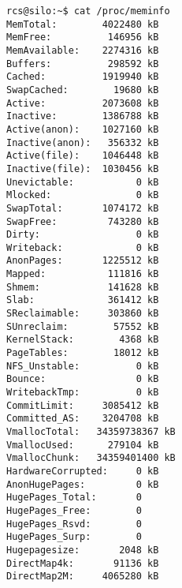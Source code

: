 \begin{lstlisting}[breaklines]
rcs@silo:~$ cat /proc/meminfo 
MemTotal:        4022480 kB
MemFree:          146956 kB
MemAvailable:    2274316 kB
Buffers:          298592 kB
Cached:          1919940 kB
SwapCached:        19680 kB
Active:          2073608 kB
Inactive:        1386788 kB
Active(anon):    1027160 kB
Inactive(anon):   356332 kB
Active(file):    1046448 kB
Inactive(file):  1030456 kB
Unevictable:           0 kB
Mlocked:               0 kB
SwapTotal:       1074172 kB
SwapFree:         743280 kB
Dirty:                 0 kB
Writeback:             0 kB
AnonPages:       1225512 kB
Mapped:           111816 kB
Shmem:            141628 kB
Slab:             361412 kB
SReclaimable:     303860 kB
SUnreclaim:        57552 kB
KernelStack:        4368 kB
PageTables:        18012 kB
NFS_Unstable:          0 kB
Bounce:                0 kB
WritebackTmp:          0 kB
CommitLimit:     3085412 kB
Committed_AS:    3204708 kB
VmallocTotal:   34359738367 kB
VmallocUsed:      279104 kB
VmallocChunk:   34359401400 kB
HardwareCorrupted:     0 kB
AnonHugePages:         0 kB
HugePages_Total:       0
HugePages_Free:        0
HugePages_Rsvd:        0
HugePages_Surp:        0
Hugepagesize:       2048 kB
DirectMap4k:       91136 kB
DirectMap2M:     4065280 kB
\end{lstlisting}